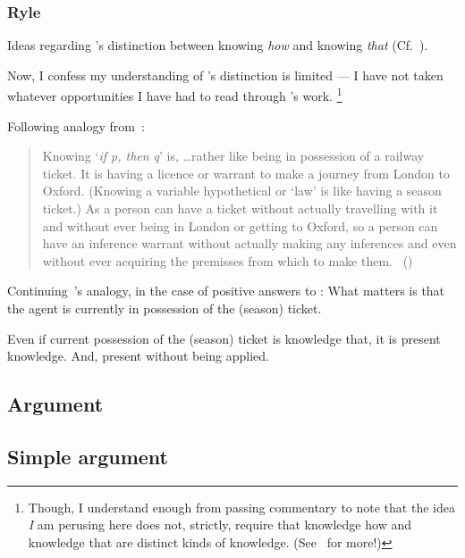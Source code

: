 \subsubsection{Ryle}

\begin{note}
  Ideas regarding \citeauthor{Ryle:1946tu}'s distinction between knowing \emph{how} and knowing \emph{that} (Cf.~\citeyear{Ryle:1946tu}).

  Now, I confess my understanding of \citeauthor{Ryle:1946tu}'s distinction is limited --- I have not taken whatever opportunities I have had to read through \citeauthor{Ryle:1946tu}'s work.%
  \footnote{
    Though, I understand enough from passing commentary to note that the idea \emph{I} am perusing here does not, strictly, require that knowledge how and knowledge that are distinct kinds of knowledge.
    (See~\textcite{Pavese:2022up} for more!)
  }

  Following analogy from~\textcite{Ryle:2009us}:

  \begin{quote}
    Knowing `\emph{if p, then q}' is, \dots rather like being in possession of a railway ticket.
    It is having a licence or warrant to make a journey from London to Oxford.
    (Knowing a variable hypothetical or `law' is like having a season ticket.)
    As a person can have a ticket without actually travelling with it and without ever being in London or getting to Oxford, so a person can have an inference warrant without actually making any inferences and even without ever acquiring the premisses from which to make them.%
    \mbox{ }\hfill\mbox{(\citeyear[250]{Ryle:2009us})}
  \end{quote}

  Continuing~\citeauthor{Ryle:2009us}'s analogy, in the case of positive answers to \qzS{}:
  What matters is that the agent is currently in possession of the (season) ticket.

  Even if current possession of the (season) ticket is knowledge that, it is present knowledge.
  And, present without being applied.
\end{note}


\subsection{Argument}
\label{sec:argument}

\subsection{Simple argument}
\label{sec:quick-argument}

